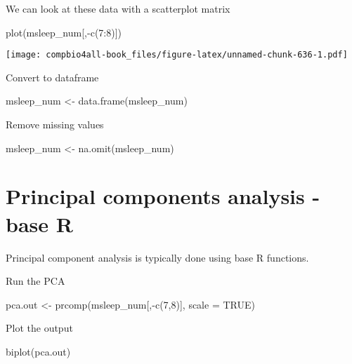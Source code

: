 \documentclass[
]{book}
\newenvironment{Shaded}{\begin{snugshade}}{\end{snugshade}}
\newcommand{\AttributeTok}[1]{\textcolor[rgb]{0.77,0.63,0.00}{#1}}
\newcommand{\ConstantTok}[1]{\textcolor[rgb]{0.00,0.00,0.00}{#1}}
\newcommand{\DecValTok}[1]{\textcolor[rgb]{0.00,0.00,0.81}{#1}}
\newcommand{\FunctionTok}[1]{\textcolor[rgb]{0.00,0.00,0.00}{#1}}
\newcommand{\NormalTok}[1]{#1}
\newcommand{\OtherTok}[1]{\textcolor[rgb]{0.56,0.35,0.01}{#1}}
\newcommand{\SpecialCharTok}[1]{\textcolor[rgb]{0.00,0.00,0.00}{#1}}
\begin{document}
We can look at these data with a scatterplot matrix

\begin{Shaded}
\begin{Highlighting}[]
\FunctionTok{plot}\NormalTok{(msleep\_num[,}\SpecialCharTok{{-}}\FunctionTok{c}\NormalTok{(}\DecValTok{7}\SpecialCharTok{:}\DecValTok{8}\NormalTok{)])}
\end{Highlighting}
\end{Shaded}

\texttt{[image: compbio4all-book\_files/figure-latex/unnamed-chunk-636-1.pdf]}

Convert to dataframe

\begin{Shaded}
\begin{Highlighting}[]
\NormalTok{msleep\_num }\OtherTok{\textless{}{-}} \FunctionTok{data.frame}\NormalTok{(msleep\_num)}
\end{Highlighting}
\end{Shaded}

Remove missing values

\begin{Shaded}
\begin{Highlighting}[]
\NormalTok{msleep\_num }\OtherTok{\textless{}{-}} \FunctionTok{na.omit}\NormalTok{(msleep\_num)}
\end{Highlighting}
\end{Shaded}

\hypertarget{principal-components-analysis---base-r}{%
\section{Principal components analysis - base R}\label{principal-components-analysis---base-r}}

Principal component analysis is typically done using base R functions.

Run the PCA

\begin{Shaded}
\begin{Highlighting}[]
\NormalTok{pca.out }\OtherTok{\textless{}{-}} \FunctionTok{prcomp}\NormalTok{(msleep\_num[,}\SpecialCharTok{{-}}\FunctionTok{c}\NormalTok{(}\DecValTok{7}\NormalTok{,}\DecValTok{8}\NormalTok{)], }\AttributeTok{scale =} \ConstantTok{TRUE}\NormalTok{)}
\end{Highlighting}
\end{Shaded}

Plot the output

\begin{Shaded}
\begin{Highlighting}[]
\FunctionTok{biplot}\NormalTok{(pca.out)}
\end{Highlighting}
\end{Shaded}
\end{document}
